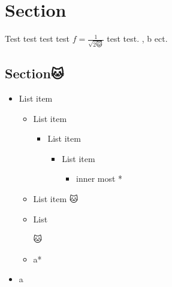 \documentclass{xyz}
\begin{document}
    \section{Section}
    Test test test test $f = \frac{1}{\sqrt{2🐱}}$ test test. \a, \🐱b ect.

    \subsection{Section🐱}
    \begin{center🐱}
        \begin{itemize}
            \item List item
            \begin{itemize}
                \item List item
                \begin{itemize}
                    \item List item
                    \begin{itemize}
                        \item List item
                        \begin{itemize}
                            \item inner most *
                        \end{itemize}
                    \end{itemize}
                \end{itemize}
                \item List item 🐱
                \item {List





                🐱}
                \item a*
            \end{itemize}
            \item a
        \end{itemize}
    \end{center🐱}
\end{document}
